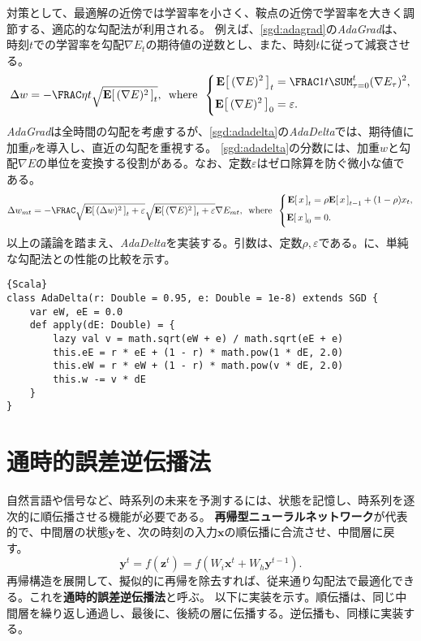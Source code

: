 \documentclass[10pt,a4paper]{book}
\begin{document}
対策として、最適解の近傍では学習率を小さく、鞍点の近傍で学習率を大きく調節する、適応的な勾配法が利用される。
例えば、\eqref{sgd:adagrad}の\textit{AdaGrad}は、時刻$t$での学習率を勾配$\nabla E_t$の期待値の逆数とし、また、時刻$t$に従って減衰させる。
%
\begin{equation}
\label{eq:sgd:adagrad}
\Delta w = -\frac{\eta}{t\sqrt{\E{(\nabla E)^2}_t}},
\where
\left\{
\begin{aligned}
\E{(\nabla E)^2}_t &= \frac{1}{t} \sum_{\tau=0}^t (\nabla E_\tau)^2, \\
\E{(\nabla E)^2}_0 &= \varepsilon.
\end{aligned}
\right.
\end{equation}
%
\textit{AdaGrad}は全時間の勾配を考慮するが、\eqref{sgd:adadelta}の\textit{AdaDelta}では、期待値に加重$\rho$を導入し、直近の勾配を重視する。
\eqref{sgd:adadelta}の分数には、加重$w$と勾配$\nabla E$の単位を変換する役割がある。なお、定数$\varepsilon$はゼロ除算を防ぐ微小な値である。
%
\begin{equation}
\label{eq:sgd:adadelta}
\Delta w_{mt} = -\frac{\sqrt{\E{(\Delta w)^2}_t+\varepsilon}}{\sqrt{\E{(\nabla E)^2}_t+\varepsilon}} \nabla E_{mt},
\where
\left\{
\begin{aligned}
\E{x}_t &= \rho \E{x}_{t-1} + (1-\rho) x_t, \\
\E{x}_0 &= 0.
\end{aligned}
\right.
\end{equation}
%
以上の議論を踏まえ、\textit{AdaDelta}を実装する。引数は、定数$\rho,\varepsilon$である。に、単純な勾配法との性能の比較を示す。

\begin{Verbatim}{Scala}
class AdaDelta(r: Double = 0.95, e: Double = 1e-8) extends SGD {
	var eW, eE = 0.0
	def apply(dE: Double) = {
		lazy val v = math.sqrt(eW + e) / math.sqrt(eE + e)
		this.eE = r * eE + (1 - r) * math.pow(1 * dE, 2.0)
		this.eW = r * eW + (1 - r) * math.pow(v * dE, 2.0)
		this.w -= v * dE
	}
}
\end{Verbatim}

\section{通時的誤差逆伝播法\label{sect:rnn}}

自然言語や信号など、時系列の未来を予測するには、状態を記憶し、時系列を逐次的に順伝播させる機能が必要である。
\textbf{再帰型ニューラルネットワーク}が代表的で、中間層の状態$\bm{y}$を、次の時刻の入力$\bm{x}$の順伝播に合流させ、中間層に戻す。
%
\begin{equation}
\label{eq:nn:rnn}
\bm{y}^t = f(\bm{z}^t) = f(W_i\bm{x}^t+W_h\bm{y}^{t-1}).
\end{equation}
%
再帰構造を展開して、擬似的に再帰を除去すれば、従来通り勾配法で最適化できる。これを\textbf{通時的誤差逆伝播法}と呼ぶ。
以下に実装を示す。順伝播は、同じ中間層を繰り返し通過し、最後に、後続の層に伝播する。逆伝播も、同様に実装する。
\end{document}
